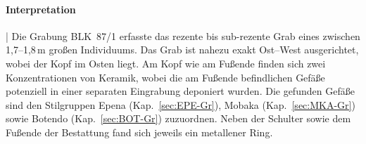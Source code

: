 \paragraph{Interpretation}\hspace{-.5em}|\hspace{.5em}%
Die Grabung BLK~87/1 erfasste das rezente bis sub-rezente Grab eines zwischen 1,7--1,8\,m großen Individuums. Das Grab ist nahezu exakt Ost--West ausgerichtet, wobei der Kopf im Osten liegt. Am Kopf wie am Fußende finden sich zwei Konzentrationen von Keramik, wobei die am Fußende befindlichen Gefäße potenziell in einer separaten Eingrabung deponiert wurden. Die gefunden Gefäße sind den Stilgruppen Epena (Kap.~\ref{sec:EPE-Gr}), Mobaka (Kap.~\ref{sec:MKA-Gr}) sowie Botendo (Kap.~\ref{sec:BOT-Gr}) zuzuordnen. Neben der Schulter sowie dem Fußende der Bestattung fand sich jeweils ein metallener Ring.